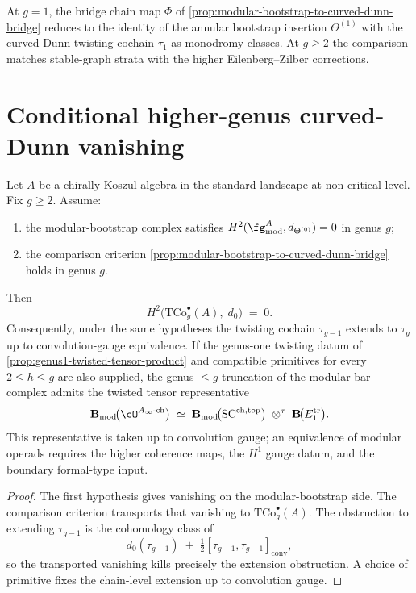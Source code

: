 \begin{remark}[Bridge at \(g = 1\)]
\label{rem:bridge-at-genus-1}
At \(g = 1\), the bridge chain map \(\Phi\) of
\autoref{prop:modular-bootstrap-to-curved-dunn-bridge} reduces to
the identity of the annular bootstrap insertion \(\Theta^{(1)}\)
with the curved-Dunn twisting cochain \(\tau_{1}\) as monodromy
classes. At \(g \ge 2\) the comparison matches stable-graph strata
with the higher Eilenberg--Zilber corrections.
\end{remark}

\section{Conditional higher-genus curved-Dunn vanishing}
\label{sec:curved-dunn-vanishing}

\begin{theorem}
\label{thm:curved-dunn-H2-vanishing-all-genera}
\ClaimStatusConditional
Let \(A\) be a chirally Koszul algebra in the standard landscape at
non-critical level. Fix \(g \ge 2\). Assume:
\begin{enumerate}
 \item the modular-bootstrap complex satisfies
 \(H^{2}(\fg^{A}_{\mathrm{mod}}, d_{\Theta^{(0)}})=0\) in genus
 \(g\);
 \item the comparison criterion
 \autoref{prop:modular-bootstrap-to-curved-dunn-bridge} holds in
 genus \(g\).
\end{enumerate}
Then
\[
 H^{2}\bigl(\mathrm{TCo}^{\bullet}_{g}(A),\; d_{0}\bigr)
 \;=\;
 0.
\]
Consequently, under the same hypotheses the twisting cochain
\(\tau_{g-1}\) extends to \(\tau_{g}\) up to convolution-gauge
equivalence. If the genus-one twisting datum of
\autoref{prop:genus1-twisted-tensor-product} and compatible primitives
for every \(2\le h\le g\) are also supplied, the genus-\(\le g\)
truncation of the modular bar complex admits the twisted tensor
representative
\[
 \mathbf{B}_{\mathrm{mod}}\!\bigl(\cO^{A_{\infty}\text{-ch}}\bigr)
 \;\simeq\;
 \mathbf{B}_{\mathrm{mod}}\!\bigl(\mathrm{SC}^{\mathrm{ch,top}}\bigr)
 \;\otimes^{\tau}\;
 \mathbf{B}\!\bigl(E_{1}^{\mathrm{tr}}\bigr).
\]
This representative is taken up to convolution gauge; an equivalence
of modular operads requires the higher coherence maps, the \(H^{1}\)
gauge datum, and the boundary formal-type input.
\end{theorem}

\begin{proof}
The first hypothesis gives vanishing on the modular-bootstrap side.
The comparison criterion transports that vanishing to
\(\mathrm{TCo}^{\bullet}_{g}(A)\). The obstruction to extending
\(\tau_{g-1}\) is the cohomology class of
\[
d_{0}(\tau_{g-1})
\;+\;\tfrac{1}{2}[\tau_{g-1},\tau_{g-1}]_{\mathrm{conv}},
\]
so the transported vanishing kills precisely the extension
obstruction. A choice of primitive fixes the chain-level extension
up to convolution gauge.
\end{proof}

